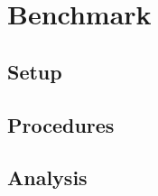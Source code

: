 \documentclass[../thesis.tex]{subfiles}
\begin{document}
\chapter{Benchmark}

\section{Setup}

\section{Procedures}

\section{Analysis}
\end{document}
